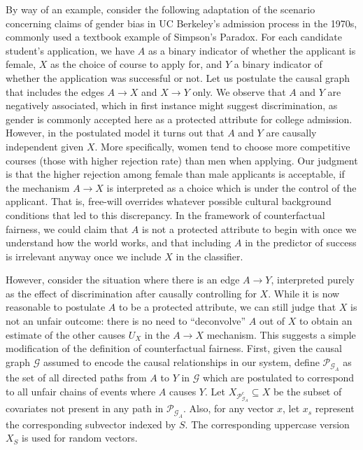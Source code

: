 By way of an example, consider the following adaptation of the
scenario concerning claims of gender bias in UC Berkeley's admission
process in the 1970s, commonly used a textbook example of Simpson's
Paradox. For each candidate student's application, we have $A$ as a
binary indicator of whether the applicant is female, $X$ as the choice
of course to apply for, and $Y$ a binary indicator of whether the
application was successful or not.  Let us postulate the causal graph
that includes the edges $A \rightarrow X$ and $X \rightarrow Y$ only.
We observe that $A$ and $Y$ are negatively associated, which in first
instance might suggest discrimination, as gender is commonly accepted
here as a protected attribute for college admission. However, in the
postulated model it turns out that $A$ and $Y$ are causally independent given
$X$. More specifically, women tend to choose more competitive courses
(those with higher rejection rate) than men when applying.  Our
judgment is that the higher rejection among female than male
applicants is acceptable, if the mechanism $A \rightarrow X$ is
interpreted as a choice which is under the control of the applicant.
That is, free-will overrides whatever possible cultural background conditions
that led to this discrepancy. In the framework of counterfactual
fairness, we could claim that $A$ is not a protected attribute to
begin with once we understand how the world works, and that including
$A$ in the predictor of success is irrelevant anyway once we include
$X$ in the classifier.

However, consider the situation where there is an edge $A \rightarrow
Y$, interpreted purely as the effect of discrimination after causally
controlling for $X$.  While it is now reasonable to postulate $A$ to
be a protected attribute, we can still judge that $X$ is not an unfair
outcome: there is no need to ``deconvolve'' $A$ out of $X$ to obtain
an estimate of the other causes $U_X$ in the $A \rightarrow X$
mechanism. This suggests a simple modification of the definition of
counterfactual fairness. First, given the causal graph $\mathcal G$ assumed to
encode the causal relationships in our system, define $\mathcal P_{\mathcal G_A}$ as
the set of all directed paths from $A$ to $Y$ in $\mathcal G$ which
are postulated to correspond to all unfair chains of events where $A$
causes $Y$. Let $X_{\mathcal P^c_{\mathcal G_A}} \subseteq X$ be the
subset of covariates not present in any path in $\mathcal P_{\mathcal
  G_A}$. Also, for any vector $x$, let $x_s$ represent the
corresponding subvector indexed by $S$. The corresponding uppercase
version $X_S$ is used for random vectors.

